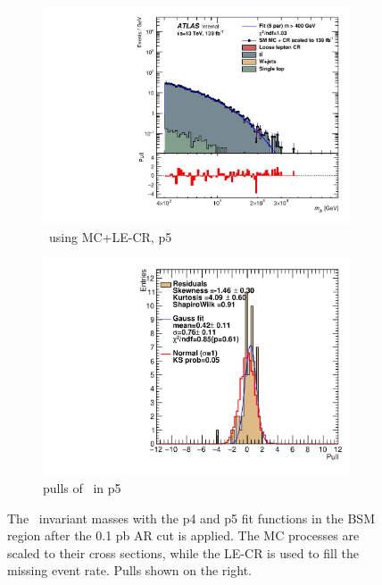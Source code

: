 \begin{figure}[ht]
\begin{subfigure}[h]{0.38\linewidth}
    \includegraphics[scale=0.3]{figs/ch6/fit/variable_nosmooth/p5/01PB/output_SMMCplusCR_Mjb_p5.pdf}%
     \caption{\mjb \ using MC+LE-CR, p5}
     \end{subfigure}
     \hfill
    \begin{subfigure}[h]{0.4\linewidth}
    \includegraphics[scale=0.32]{figs/ch6/fit/variable_nosmooth/p5/01PB/pull_SMMCplusCR_Mjb_p5.pdf}%
    \caption{pulls of \mjb \ in p5}
    \end{subfigure}
    \caption{The \mjb \ invariant masses with the p4 and p5 fit functions in the BSM region after the 0.1 pb AR cut is applied. The MC processes are scaled to their cross sections, while the LE-CR is used to fill the missing event rate. Pulls shown on the right.}
\label{fig:mjb-fit-pulls-01pb}
\end{figure}

